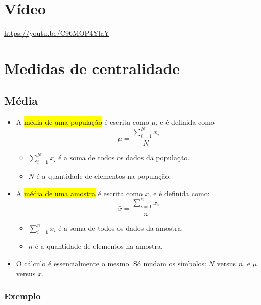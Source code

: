 \documentclass[
  11pt]{report}
\begin{document}
\hypertarget{vuxeddeo}{%
\section{Vídeo}\label{vuxeddeo}}

\begin{center} \url{https://youtu.be/C96MOP4YlaY} \end{center}

\hypertarget{medidas-de-centralidade}{%
\section{Medidas de centralidade}\label{medidas-de-centralidade}}

\hypertarget{muxe9dia}{%
\subsection{Média}\label{muxe9dia}}

\begin{itemize}
\item
  A {\hl{média de uma população}} é escrita como $\mu$, e é definida como
  \[\mu = \frac{\sum_{i=1}^N x_i}{N}\]

  \begin{itemize}
  \item
    $\sum_{i=1}^N x_i$ é a soma de todos os dados da população.
  \item
    $N$ é a quantidade de elementos na população.
  \end{itemize}
\item
  A {\hl{média de uma amostra}} é escrita como $\bar x$, e é definida como:
  \[\bar x = \frac{\sum_{i=1}^n x_i}{n}\]

  \begin{itemize}
  \item
    $\sum_{i=1}^n x_i$ é a soma de todos os dados da amostra.
  \item
    $n$ é a quantidade de elementos na amostra.
  \end{itemize}
\item
  O cálculo é essencialmente o mesmo. Só mudam os símbolos: $N$ versus $n$, e $\mu$ versus $\bar x$.
\end{itemize}

\hypertarget{exemplo}{%
\subsubsection{Exemplo}\label{exemplo}}
\end{document}
